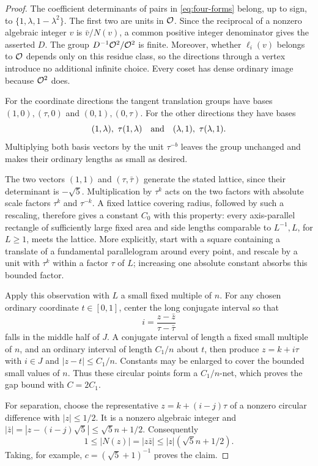 \begin{proof}
The coefficient determinants of pairs in \eqref{eq:four-forms} belong,
up to sign, to $\{1,\lambda,1-\lambda^2\}$. The first two are units in
$\mathcal O$. Since the reciprocal of a nonzero algebraic integer $v$ is
$\bar v/N(v)$, a common positive integer denominator gives the asserted
$D$. The group $D^{-1}\mathcal O^2/\mathcal O^2$ is finite. Moreover, whether
$\ell_i(v)$ belongs to $\mathcal O$ depends only on this residue class, so
the directions through a vertex introduce no additional infinite
choice. Every coset has dense ordinary image because $\mathcal O^2$ does.

For the coordinate directions the tangent translation groups have
bases $(1,0),(\tau,0)$ and $(0,1),(0,\tau)$. For the other directions
they have bases
\[
 (1,\lambda),\ \tau(1,\lambda)
 \quad\hbox{and}\quad
 (\lambda,1),\ \tau(\lambda,1).
\]
Multiplying both basis vectors by the unit $\tau^{-b}$ leaves the
group unchanged and makes their ordinary lengths as small as desired.

The two vectors $(1,1)$ and $(\tau,\bar\tau)$ generate the stated
lattice, since their determinant is $-\sqrt5$. Multiplication by
$\tau^k$ acts on the two factors with absolute scale factors
$\tau^k$ and $\tau^{-k}$. A fixed lattice covering radius, followed
by such a rescaling, therefore gives a constant $C_0$ with this
property: every axis-parallel rectangle of sufficiently large fixed
area and side lengths comparable to $L^{-1},L$, for $L\ge1$, meets
the lattice. More explicitly, start with a square containing a
translate of a fundamental parallelogram around every point, and
rescale by a unit with $\tau^k$ within a factor $\tau$ of $L$;
increasing one absolute constant absorbs this bounded factor.

Apply this observation with $L$ a small fixed multiple of $n$.
For any chosen ordinary coordinate $t\in[0,1]$, center the long
conjugate interval so that
\[
 i=\frac{z-\bar z}{\tau-\bar\tau}
\]
falls in the middle half of $J$. A conjugate interval of length a
fixed small multiple of $n$, and an ordinary interval of length
$C_1/n$ about $t$, then produce $z=k+i\tau$ with $i\in J$ and
$|z-t|\le C_1/n$. Constants may be enlarged to cover the bounded
small values of $n$. Thus these circular points form a
$C_1/n$-net, which proves the gap bound with $C=2C_1$.

For separation, choose the representative
$z=k+(i-j)\tau$ of a nonzero circular difference with $|z|\le1/2$.
It is a nonzero algebraic integer and
$|\bar z|=|z-(i-j)\sqrt5|\le\sqrt5 n+1/2$.
Consequently
\[
 1\le |N(z)|=|z\bar z|
 \le |z|(\sqrt5 n+1/2).
\]
Taking, for example, $c=(\sqrt5+1)^{-1}$ proves the claim.
\end{proof}

